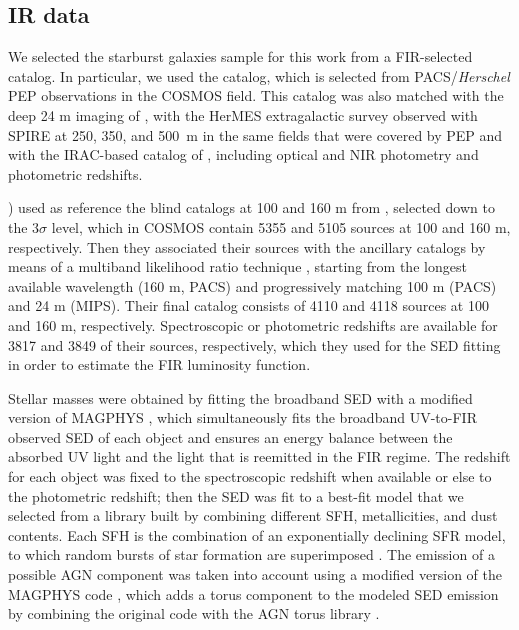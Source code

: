 \subsection{IR data}\label{ssec:IRdata}
We selected the starburst galaxies sample for this work from a FIR-selected catalog. In particular, we used the \citet{2013MNRAS.432...23G} catalog, which is selected from PACS/\textit{Herschel} PEP observations in the COSMOS field. This catalog was also matched with the deep 24 \textmu m imaging of \citet{2009ApJ...703..222L}, with the HerMES extragalactic survey \citep{2012MNRAS.424.1614O} observed with SPIRE at 250, 350, and 500~\textmu m in the same fields that were covered by PEP and with the IRAC-based catalog of \citet{2010ApJ...709..644I}, including optical and NIR photometry and photometric redshifts.

\citet{2013MNRAS.432...23G}) used as reference the blind catalogs at 100 and 160 \textmu m from \citet{2010A&A...518L..30B,2011A&A...532A..49B}, selected down to the $3\sigma$ level, which in COSMOS contain 5355 and 5105 sources at 100 and 160 \textmu m, respectively. Then they associated their sources with the ancillary catalogs by means of a multiband likelihood ratio technique \citep{1992MNRAS.259..413S,2001Ap&SS.276..957C}, starting from the longest available wavelength (160 \textmu m, PACS) and progressively matching 100 \textmu m (PACS) and 24 \textmu m (MIPS). Their final catalog consists of 4110 and 4118 sources at 100 and 160 \textmu m, respectively. Spectroscopic or photometric redshifts are available for 3817 and 3849 of their sources, respectively, which they used for the SED fitting in order to estimate the FIR luminosity function.

Stellar masses were obtained by fitting the broadband SED with a modified version of MAGPHYS \citep*{2008MNRAS.388.1595D}, which  simultaneously fits the broadband UV-to-FIR observed SED of each object and ensures an energy balance between the absorbed UV light and the light that is reemitted in the FIR regime. The redshift for each object was fixed to the spectroscopic redshift when available or else to the photometric redshift; then the SED was fit to a best-fit model that we selected from a library built by combining different SFH, metallicities, and dust contents. Each SFH is the combination of an exponentially declining SFR model, to which random bursts of star formation are superimposed \citep[see][]{2008MNRAS.388.1595D, 2010MNRAS.403.1894D}. The emission of a possible AGN component was taken into account using a modified version of the MAGPHYS code \citep[SED3FIT,][]{2013A&A...551A.100B}, which adds a torus component to the modeled SED emission by combining the \citet{2008MNRAS.388.1595D} original code with the \citet*{2006MNRAS.366..767F} AGN torus library \citep[see also][]{2012MNRAS.426..120F}.

